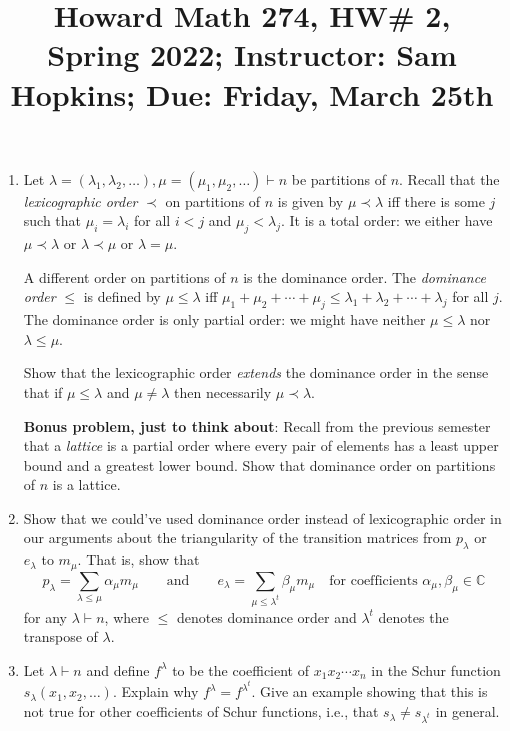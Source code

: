 \documentclass[11pt]{article}
\title{Howard Math 274, HW\# 2, \\ {\normalsize Spring 2022; Instructor: Sam Hopkins; Due: Friday, March 25th}}
\date{}
\begin{document}
\maketitle

\thispagestyle{empty}

\vspace{-1.5cm}

\begin{enumerate}

\item Let $\lambda=(\lambda_1,\lambda_2,\ldots), \mu=(\mu_1,\mu_2,\ldots) \vdash n$ be partitions of $n$. Recall that the \emph{lexicographic order} $\prec$ on partitions of $n$ is given by $\mu \prec \lambda$ iff there is some $j$ such that $\mu_i=\lambda_i$ for all $i < j$ and $\mu_j < \lambda_j$. It is a total order: we either have $\mu \prec \lambda$ or $\lambda \prec \mu$ or $\lambda = \mu$.

A different order on partitions of $n$ is the dominance order. The \emph{dominance order} $\leq$ is defined by $\mu \leq \lambda$ iff $\mu_1 + \mu_2 + \cdots + \mu_j \leq \lambda_1 + \lambda_2 + \cdots + \lambda_j$ for all $j$. The dominance order is only partial order: we might have neither $\mu \leq \lambda$ nor $\lambda \leq \mu$.

Show that the lexicographic order \emph{extends} the dominance order in the sense that if $\mu \leq \lambda$ and $\mu \neq \lambda$ then necessarily $\mu \prec \lambda$.

{\bf Bonus problem, just to think about}: Recall from the previous semester that a \emph{lattice} is a partial order where every pair of elements has a least upper bound and a greatest lower bound. Show that dominance order on partitions of $n$ is a lattice.

\item Show that we could've used dominance order instead of lexicographic order in our arguments about the triangularity of the transition matrices from $p_{\lambda}$ or $e_{\lambda}$ to $m_{\mu}$. That is, show that
\[ p_{\lambda} = \sum_{\lambda \leq \mu} \alpha_{\mu} m_{\mu} \qquad \textrm{and} \qquad e_{\lambda} = \sum_{\mu \leq \lambda^t} \beta_{\mu} m_{\mu} \quad \textrm{for coefficients $\alpha_{\mu},\beta_{\mu}\in\mathbb{C}$}\]
for any $\lambda \vdash n$, where $\leq$ denotes dominance order and $\lambda^t$ denotes the transpose of $\lambda$.

\item Let $\lambda \vdash n$ and define $f^{\lambda}$ to be the coefficient of $x_1x_2\cdots x_n$ in the Schur function $s_{\lambda}(x_1,x_2,\ldots)$. Explain why $f^{\lambda} = f^{\lambda^t}$. Give an example showing that this is not true for other coefficients of Schur functions, i.e., that $s_{\lambda} \neq s_{\lambda^t}$ in general.


\end{enumerate}
\end{document}
